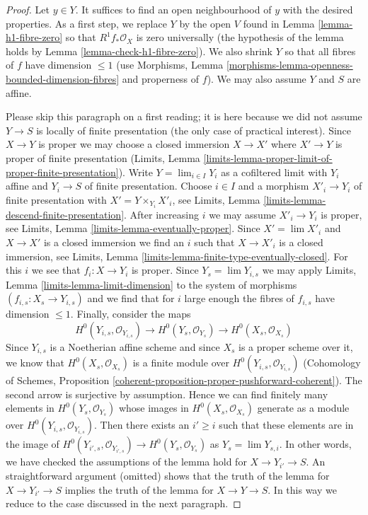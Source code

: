 \begin{proof}
Let $y \in Y$. It suffices to find an open neighbourhood of $y$
with the desired properties. As a first step, we replace $Y$
by the open $V$ found in Lemma \ref{lemma-h1-fibre-zero} so that
$R^1f_*\mathcal{O}_X$ is zero universally (the hypothesis of
the lemma holds by Lemma \ref{lemma-check-h1-fibre-zero}).
We also shrink $Y$ so that all fibres of $f$ have dimension $\leq 1$
(use Morphisms, Lemma
\ref{morphisms-lemma-openness-bounded-dimension-fibres}
and properness of $f$).
We may also assume $Y$ and $S$ are affine.

\medskip\noindent
Please skip this paragraph on a first reading; it is here because
we did not assume $Y \to S$ is locally of finite presentation
(the only case of practical interest).
Since $X \to Y$ is proper we may
choose a closed immersion $X \to X'$ where $X' \to Y$ is proper
of finite presentation
(Limits, Lemma \ref{limits-lemma-proper-limit-of-proper-finite-presentation}).
Write $Y = \lim_{i \in I} Y_i$ as a cofiltered limit with $Y_i$
affine and $Y_i \to S$ of finite presentation.
Choose $i \in I$ and a morphism $X'_i \to Y_i$ of finite presentation
with $X' = Y \times_{Y_i} X'_i$, see
Limits, Lemma \ref{limits-lemma-descend-finite-presentation}.
After increasing $i$ we may assume $X'_i \to Y_i$ is proper, see
Limits, Lemma \ref{limits-lemma-eventually-proper}.
Since $X' = \lim X'_i$ and $X \to X'$ is a closed immersion
we find an $i$ such that $X \to X'_i$ is a closed immersion, see
Limits, Lemma \ref{limits-lemma-finite-type-eventually-closed}.
For this $i$ we see that $f_i : X \to Y_i$ is proper.
Since $Y_s = \lim Y_{i, s}$ we may apply Limits, Lemma
\ref{limits-lemma-limit-dimension}
to the system of morphisms $(f_{i, s} : X_s \to Y_{i, s})$
and we find that for $i$ large enough the fibres of $f_{i, s}$
have dimension $\leq 1$. Finally, consider the maps
$$
H^0(Y_{i, s}, \mathcal{O}_{Y_{i, s}}) \to
H^0(Y_s, \mathcal{O}_{Y_s}) \to
H^0(X_s, \mathcal{O}_{X_s})
$$
Since $Y_{i, s}$ is a Noetherian affine scheme and since $X_s$ is a
proper scheme over it, we know that $H^0(X_s, \mathcal{O}_{X_s})$
is a finite module over $H^0(Y_{i, s}, \mathcal{O}_{Y_{i, s}})$
(Cohomology of Schemes, Proposition
\ref{coherent-proposition-proper-pushforward-coherent}).
The second arrow is surjective by assumption. Hence we can find
finitely many elements in $H^0(Y_s, \mathcal{O}_{Y_s})$ whose
images in $H^0(X_s, \mathcal{O}_{X_s})$ generate as a module over
$H^0(Y_{i, s}, \mathcal{O}_{Y_{i, s}})$. Then there exists an
$i' \geq i$ such that these elements are in the image of
$H^0(Y_{i', s}, \mathcal{O}_{Y_{i', s}}) \to
H^0(Y_s, \mathcal{O}_{Y_s})$ as $Y_s = \lim Y_{s, i}$.
In other words, we have checked the assumptions of the lemma hold for
$X \to Y_{i'} \to S$. An straightforward argument (omitted)
shows that the truth of the lemma for $X \to Y_{i'} \to S$
implies the truth of the lemma for $X \to Y \to S$.
In this way we reduce to the case discussed in the next paragraph.


\end{proof}
